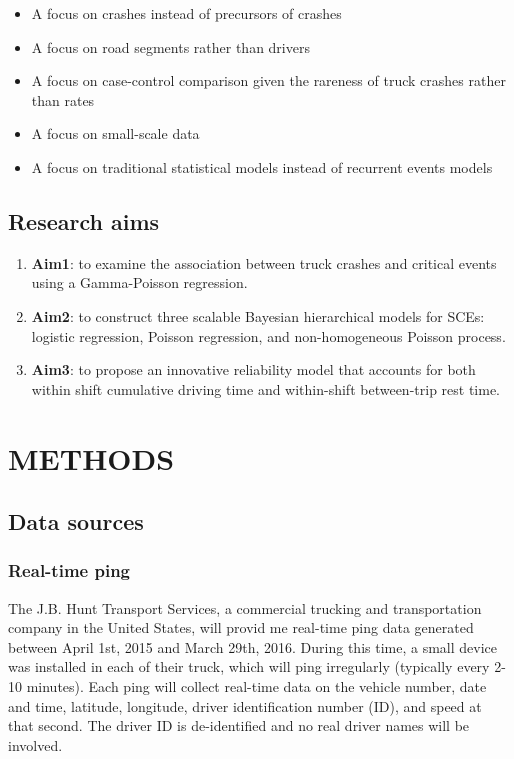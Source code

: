 \documentclass[12pt]{book}
\numberwithin{equation}{chapter}
\providecommand{\tightlist}{%
  \setlength{\itemsep}{0pt}\setlength{\parskip}{0pt}}
\begin{document}
\begin{itemize}
\tightlist
\item
  A focus on crashes instead of precursors of crashes
\item
  A focus on road segments rather than drivers
\item
  A focus on case-control comparison given the rareness of truck crashes rather than rates
\item
  A focus on small-scale data
\item
  A focus on traditional statistical models instead of recurrent events models
\end{itemize}

\hypertarget{research-aims}{%
\section{Research aims}\label{research-aims}}

\begin{enumerate}
\def\labelenumi{\arabic{enumi}.}
\item
  \textbf{Aim1}: to examine the association between truck crashes and critical events using a Gamma-Poisson regression.
\item
  \textbf{Aim2}: to construct three scalable Bayesian hierarchical models for SCEs: logistic regression, Poisson regression, and non-homogeneous Poisson process.
\item
  \textbf{Aim3}: to propose an innovative reliability model that accounts for both within shift cumulative driving time and within-shift between-trip rest time.
\end{enumerate}

\hypertarget{methods}{%
\chapter{METHODS}\label{methods}}

\hypertarget{data-sources}{%
\section{Data sources}\label{data-sources}}

\hypertarget{real-time-ping}{%
\subsection{Real-time ping}\label{real-time-ping}}

The J.B. Hunt Transport Services, a commercial trucking and transportation company in the United States, will provid me real-time ping data generated between April 1st, 2015 and March 29th, 2016. During this time, a small device was installed in each of their truck, which will ping irregularly (typically every 2-10 minutes). Each ping will collect real-time data on the vehicle number, date and time, latitude, longitude, driver identification number (ID), and speed at that second. The driver ID is de-identified and no real driver names will be involved.
\end{document}
